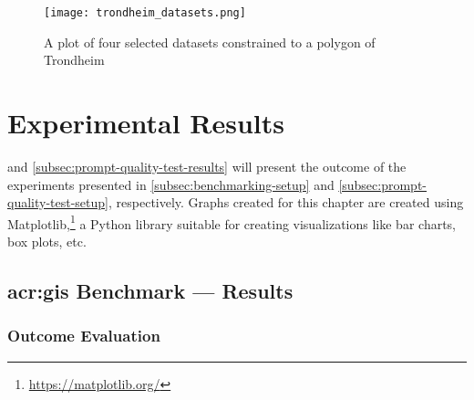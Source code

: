 

\begin{figure}
    \centering
    \texttt{[image: trondheim\_datasets.png]}
    \caption{A plot of four selected datasets constrained to a polygon of Trondheim}
    \label{fig:datasets-trondheim}
\end{figure}


\section{Experimental Results}
\label{sec:experimental-results}

\begin{comment}
Results should be clearly displayed and should provide a suitable representation of your results for the points you wish to make.
Graphs should be labelled in a legible font. If more than one result is displayed in the same graph, then these should be clearly marked.
Please choose carefully rather than presenting every result. Too much information is hard to read and often hides the key information you wish to present. Make use of statistical methods when presenting results, where possible to strengthen the results.
Further, the format of the presentation of results should be chosen based on what issues in the results you wish to highlight.
You may wish to present a subset in the experimental section and provide additional results in an appendix.
Point out specifics here but save the overall/general discussion to the Discussion chapter.
\end{comment}

 and \autoref{subsec:prompt-quality-test-results} will present the outcome of the experiments presented in \autoref{subsec:benchmarking-setup} and \autoref{subsec:prompt-quality-test-setup}, respectively. Graphs created for this chapter are created using Matplotlib,\footnote{\url{https://matplotlib.org/}} a Python library suitable for creating visualizations like bar charts, box plots, etc.


\subsection[GIS Benchmark --- Results]{\acrshort{acr:gis} Benchmark --- Results}
\label{subsec:quantitative-results}

\subsubsection{Outcome Evaluation}

